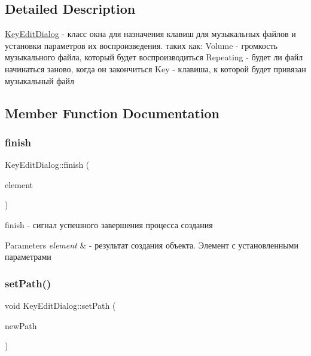 \subsection{Detailed Description}
\hyperlink{class_key_edit_dialog}{Key\+Edit\+Dialog} -\/ класс окна для назначения клавиш для музыкальных файлов и установки параметров их воспроизведения. таких как\+: Volume -\/ громкость музыкального файла, который будет воспроизводиться Repeating -\/ будет ли файл начинаться заново, когда он закончиться Key -\/ клавиша, к которой будет привязан музыкальный файл 

\subsection{Member Function Documentation}
\mbox{\label{class_key_edit_dialog_a97e7fe242369a04650fea473fb1d68a4}} 
\subsubsection{\texorpdfstring{finish}{finish}}
{\footnotesize\ttfamily Key\+Edit\+Dialog\+::finish (\begin{DoxyParamCaption}\item[{\hyperlink{class_key_element}{Key\+Element} $\ast$}]{element }\end{DoxyParamCaption})\hspace{0.3cm}{\ttfamily [signal]}}



finish -\/ сигнал успешного завершения процесса создания 


\begin{DoxyParams}{Parameters}
{\em element} & -\/ результат создания объекта. Элемент с установленными параметрами \\
\hline
\end{DoxyParams}
\mbox{\label{class_key_edit_dialog_a88b517565674d5112be255d7f0808efe}} 
\subsubsection{\texorpdfstring{set\+Path()}{setPath()}}
{\footnotesize\ttfamily void Key\+Edit\+Dialog\+::set\+Path (\begin{DoxyParamCaption}\item[{Q\+Tree\+Widget\+Item $\ast$}]{new\+Path }\end{DoxyParamCaption})}




